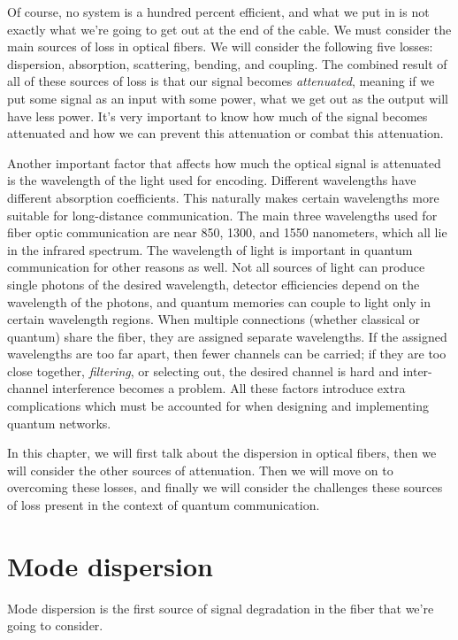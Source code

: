 Of course, no system is a hundred percent efficient, and what we put in is not exactly what we're going to get out at the end of the cable. We must consider the main sources of loss in optical fibers. We will consider the following five losses: dispersion, absorption, scattering, bending, and coupling. The combined result of all of these sources of loss is that our signal becomes \emph{attenuated}, meaning if we put some signal as an input with some power, what we get out as the output will have less power. It's very important to know how much of the signal becomes attenuated and how we can prevent this attenuation or combat this attenuation.

Another important factor that affects how much the optical signal is attenuated is the wavelength of the light used for encoding.
Different wavelengths have different absorption coefficients.
This naturally makes certain wavelengths more suitable for long-distance communication.
The main three wavelengths used for fiber optic communication are near 850, 1300, and 1550 nanometers, which all lie in the infrared spectrum.
The wavelength of light is important in quantum communication for other reasons as well.
Not all sources of light can produce single photons of the desired wavelength, detector efficiencies depend on the wavelength of the photons, and quantum memories can couple to light only in certain wavelength regions. When multiple connections (whether classical or quantum) share the fiber, they are assigned separate wavelengths. If the assigned wavelengths are too far apart, then fewer channels can be carried; if they are too close together, \emph{filtering}, or selecting out, the desired channel is hard and inter-channel interference becomes a problem. 
All these factors introduce extra complications which must be accounted for when designing and implementing quantum networks.

In this chapter, we will first talk about the dispersion in optical fibers, then we will consider the other sources of attenuation. Then we will move on to overcoming these losses, and finally we will consider the challenges these sources of loss present in the context of quantum communication.


\section{Mode dispersion}
\label{sec:11-2_mode_dispersion}

Mode dispersion is the first source of signal degradation in the fiber that we're going to consider.

